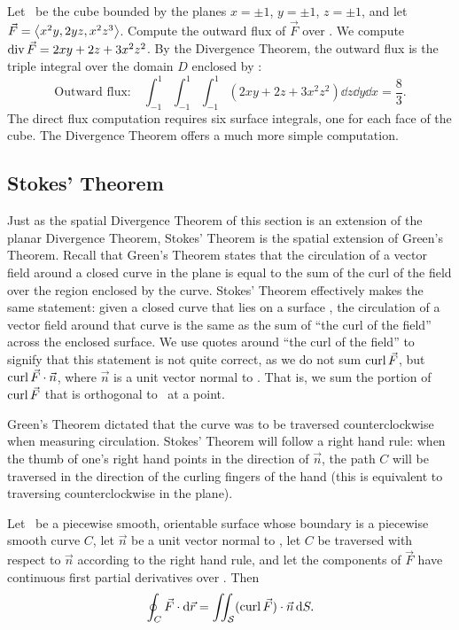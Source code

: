 \begin{example}\label{ex_divthm_space4}%
Let \surfaceS\ be the cube bounded by the planes $x=\pm 1$, $y=\pm 1$, $z=\pm 1$, and let $\vec F =\left\langle x^2y,2yz,x^2z^3\right\rangle$. Compute the outward flux of $\vec F$ over \surfaceS.
\solution
We compute $\operatorname{div} \vec F = 2xy+2z+3x^2z^2$. By the Divergence Theorem, the outward flux is the triple integral over the domain $D$ enclosed by \surfaceS:
\[
\text{Outward flux:}
\quad \int_{-1}^1\int_{-1}^1\int_{-1}^1(2xy+2z+3x^2z^2)\dd z\dd y\dd x = \frac83.
\]
The direct flux computation requires six surface integrals, one for each face of the cube. The Divergence Theorem offers a much more simple computation.
\end{example}

\subsection{Stokes' Theorem}

Just as the spatial Divergence Theorem of this section is an extension of the planar Divergence Theorem, Stokes' Theorem is the spatial extension of Green's Theorem. Recall that Green's Theorem states that the circulation of a vector field around a closed curve in the plane is equal to the sum of the curl of the field over the region enclosed by the curve. Stokes' Theorem effectively makes the same statement: given a closed curve that lies on a surface \surfaceS, the circulation of a vector field around that curve is the same as the sum of ``the curl of the field'' across the enclosed surface. We use quotes around ``the curl of the field'' to signify that this statement is not quite correct, as we do not sum $\operatorname{curl} \vec F$, but $\operatorname{curl} \vec F\cdot\vec n$, where $\vec n$ is a unit vector normal to \surfaceS. That is, we sum the portion of $\operatorname{curl} \vec F$ that is orthogonal to \surfaceS\ at a point.

Green's Theorem dictated that the curve was to be traversed counterclockwise when measuring circulation. Stokes' Theorem will follow a right hand rule: when the thumb of one's right hand points in the direction of $\vec n$, the path $C$ will be traversed in the direction of the curling fingers of the hand (this is equivalent to traversing counterclockwise in the plane).

\begin{theorem}\label{thm:stokes_thm}%
Let \surfaceS\ be a piecewise smooth, orientable surface whose boundary is a piecewise smooth curve $C$, let $\vec n$ be a unit vector normal to \surfaceS, let $C$ be traversed with respect to $\vec n$ according to the right hand rule, and let the components of $\vec F$ have continuous first partial derivatives over \surfaceS. Then
\[\oint_C \vec F\cdot\operatorname{d}\!\vec r = \iint_{\mathcal{S}} (\operatorname{curl}\vec F)\cdot \vec n\operatorname{d}\! S.\]
\end{theorem}

